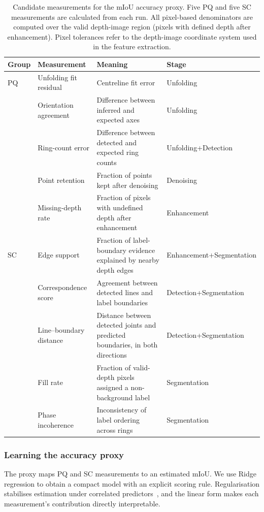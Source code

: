 \documentclass[a4paper,fleqn]{cas-dc}
\begin{document}
{\begin{table}[t]
\caption{Candidate measurements for the mIoU accuracy proxy. Five PQ and five SC measurements are calculated from each run. All pixel-based denominators are computed over the valid depth-image region (pixels with defined depth after enhancement). Pixel tolerances refer to the depth-image coordinate system used in the feature extraction.}
\label{tab:candidate-features}
\centering
\small
\setlength{\tabcolsep}{3pt}
\begin{tabular}{p{} p{} p{} p{}}
\toprule
Group & Measurement & Meaning & Stage \\
\midrule
PQ & Unfolding fit residual & Centreline fit error & Unfolding \\
 & Orientation agreement & Difference between inferred and expected axes & Unfolding \\
 & Ring-count error & Difference between detected and expected ring counts & Unfolding+Detection \\
 & Point retention & Fraction of points kept after denoising & Denoising \\
 & Missing-depth rate & Fraction of pixels with undefined depth after enhancement & Enhancement \\
SC & Edge support & Fraction of label-boundary evidence explained by nearby depth edges & Enhancement+Segmentation \\
 & Correspondence score & Agreement between detected lines and label boundaries & Detection+Segmentation \\
 & Line--boundary distance & Distance between detected joints and predicted boundaries, in both directions & Detection+Segmentation \\
 & Fill rate & Fraction of valid-depth pixels assigned a non-background label & Segmentation \\
 & Phase incoherence & Inconsistency of label ordering across rings & Segmentation \\
\bottomrule
\end{tabular}
\end{table}

\subsubsection{Learning the accuracy proxy}
\label{sec:ridge-proxy}

The proxy maps PQ and SC measurements to an estimated mIoU. We use Ridge regression to obtain a compact model with an explicit scoring rule. Regularisation stabilises estimation under correlated predictors~\cite{hoerl1970ridge,pedregosa2011sklearn}, and the linear form makes each measurement's contribution directly interpretable.

}
\end{document}
